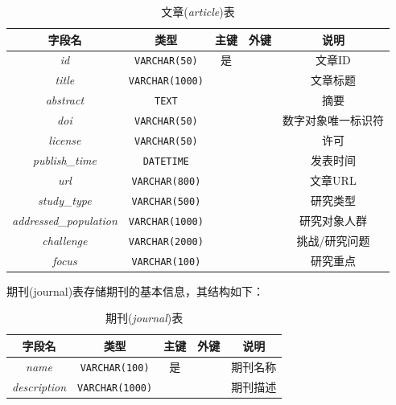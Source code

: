 \documentclass[UTF8,openany]{ctexbook}
\begin{document}
\begin{table}[H]
    \centering
    \begin{tabular}{|c|c|c|c|c|}
        \hline
        \textbf{字段名} & \textbf{类型} & \textbf{主键} & \textbf{外键} & \textbf{说明} \\
        \hline
        \textit{id} & \texttt{VARCHAR(50)} & 是 &  & 文章ID \\
        \hline
        \textit{title} & \texttt{VARCHAR(1000)} &  &  & 文章标题 \\
        \hline
        \textit{abstract} & \texttt{TEXT} &  &  & 摘要 \\
        \hline
        \textit{doi} & \texttt{VARCHAR(50)} &  &  & 数字对象唯一标识符 \\
        \hline
        \textit{license} & \texttt{VARCHAR(50)} &  &  & 许可 \\
        \hline
        \textit{publish\_time} & \texttt{DATETIME} &  &  & 发表时间 \\
        \hline
        \textit{url} & \texttt{VARCHAR(800)} &  &  & 文章URL \\
        \hline
        \textit{study\_type} & \texttt{VARCHAR(500)} &  &  & 研究类型 \\
        \hline
        \textit{addressed\_population} & \texttt{VARCHAR(1000)} &  &  & 研究对象人群 \\
        \hline
        \textit{challenge} & \texttt{VARCHAR(2000)} &  &  & 挑战/研究问题 \\
        \hline
        \textit{focus} & \texttt{VARCHAR(100)} &  &  & 研究重点 \\
        \hline
    \end{tabular}
    \caption{文章(\textit{article})表}
\end{table}

期刊(journal)表存储期刊的基本信息，其结构如下：

\begin{table}[H]
    \centering
    \begin{tabular}{|c|c|c|c|c|}
        \hline
        \textbf{字段名} & \textbf{类型} & \textbf{主键} & \textbf{外键} & \textbf{说明} \\
        \hline
        \textit{name} & \texttt{VARCHAR(100)} & 是 &  & 期刊名称 \\
        \hline
        \textit{description} & \texttt{VARCHAR(1000)} &  &  & 期刊描述 \\
        \hline
    \end{tabular}
    \caption{期刊(\textit{journal})表}
\end{table}
\end{document}
